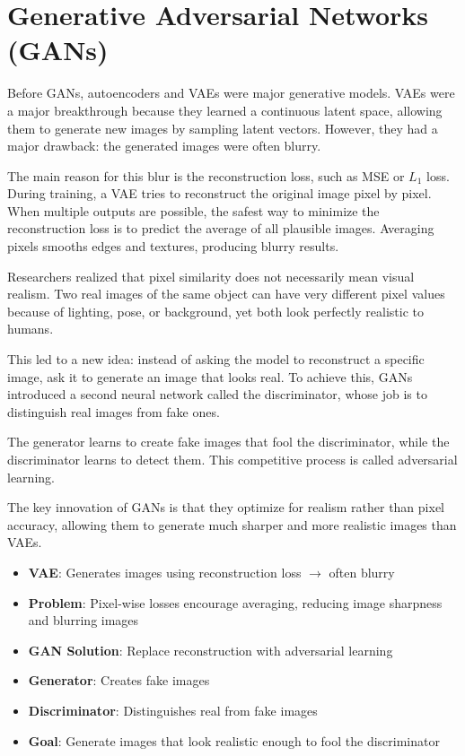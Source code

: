 \chapter{Generative Adversarial Networks (GANs)}

Before GANs, autoencoders and VAEs were major generative models. VAEs were a major breakthrough because they learned a continuous latent space, allowing them to generate new images by sampling latent vectors. However, they had a major drawback: the generated images were often blurry.

The main reason for this blur is the reconstruction loss, such as MSE or $L_1$ loss. During training, a VAE tries to reconstruct the original image pixel by pixel. When multiple outputs are possible, the safest way to minimize the reconstruction loss is to predict the average of all plausible images. Averaging pixels smooths edges and textures, producing blurry results.

Researchers realized that pixel similarity does not necessarily mean visual realism. Two real images of the same object can have very different pixel values because of lighting, pose, or background, yet both look perfectly realistic to humans.

This led to a new idea: instead of asking the model to reconstruct a specific image, ask it to generate an image that looks real. To achieve this, GANs introduced a second neural network called the discriminator, whose job is to distinguish real images from fake ones.

The generator learns to create fake images that fool the discriminator, while the discriminator learns to detect them. This competitive process is called adversarial learning.

The key innovation of GANs is that they optimize for realism rather than pixel accuracy, allowing them to generate much sharper and more realistic images than VAEs.

\begin{propertybox}
\begin{itemize}
    \item \textbf{VAE}: Generates images using reconstruction loss $\rightarrow$ often blurry
    \item \textbf{Problem}: Pixel-wise losses encourage averaging, reducing image sharpness and blurring images
    \item \textbf{GAN Solution}: Replace reconstruction with adversarial learning
    \item \textbf{Generator}: Creates fake images
    \item \textbf{Discriminator}: Distinguishes real from fake images
    \item \textbf{Goal}: Generate images that look realistic enough to fool the discriminator
\end{itemize}
\end{propertybox}

